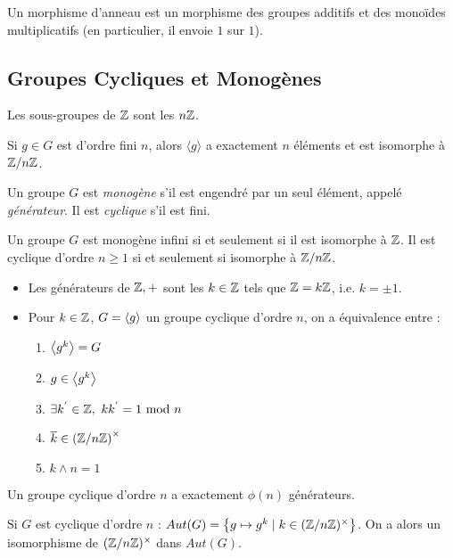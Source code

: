 \documentclass{cours}
\begin{document}
\begin{definition}
    Un morphisme d'anneau est un morphisme des groupes additifs et des monoïdes multiplicatifs (en particulier, il envoie $1$ sur $1$).
\end{definition}

\subsection{Groupes Cycliques et Monogènes}
\begin{proposition}
    Les sous-groupes de $\mathbb{Z}$ sont les $n\mathbb{Z}$.
\end{proposition}

\begin{proposition}
    Si $g \in G$ est d'ordre fini $n$, alors $\langle g \rangle$ a exactement $n$ éléments et est isomorphe à $\mathbb{Z}/n\mathbb{Z}$.
\end{proposition}

\begin{definition}
    Un groupe $G$ est \emph{monogène} s'il est engendré par un seul élément, appelé \emph{générateur}. Il est \emph{cyclique} s'il est fini.
\end{definition}

\begin{corollary}
    Un groupe $G$ est monogène infini si et seulement si il est isomorphe à $\mathbb{Z}$. Il est cyclique d'ordre $n \geq 1$ si et seulement si isomorphe à $\mathbb{Z}/n\mathbb{Z}$.
\end{corollary}

\begin{proposition}
    \begin{itemize}
        \item Les générateurs de $\mathbb{Z}, +$ sont les $k \in \mathbb{Z}$ tels que $\mathbb{Z} = k\mathbb{Z}$, i.e. $k = \pm 1$.
        \item Pour $k \in \mathbb{Z}$, $G = \left\langle g \right\rangle$ un groupe cyclique d'ordre $n$, on a équivalence entre :
              \begin{enumerate}
                  \item $\left\langle g^{k} \right\rangle = G$
                  \item $g \in \left\langle g^{k} \right\rangle$
                  \item $\exists k^{'} \in \mathbb{Z},\ kk^{'} = 1 \text{ mod } n$
                  \item $\overline{k} \in \left(\mathbb{Z}/n\mathbb{Z}\right)^{\times}$
                  \item $k \wedge n = 1$
              \end{enumerate}
    \end{itemize}
\end{proposition}
\begin{corollary}
    Un groupe cyclique d'ordre $n$ a exactement $\phi(n)$ générateurs.
\end{corollary}
\begin{corollary}
    Si $G$ est cyclique d'ordre $n$ : $Aut(G) = \left\{g \mapsto g^{k} \mid k \in (\mathbb{Z}/n\mathbb{Z})^{\times}\right\}$. On a alors un isomorphisme de $(\mathbb{Z}/n\mathbb{Z})^{\times}$ dans $Aut(G)$.
\end{corollary}
\end{document}
